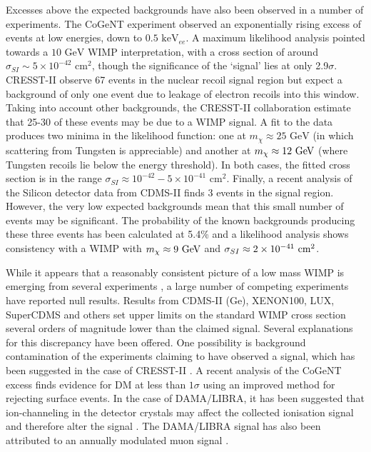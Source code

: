 Excesses above the expected backgrounds have also been observed in a number of experiments.%
The CoGeNT experiment observed an exponentially rising excess of events at low energies, down to $0.5 \textrm{ keV}_{ee}$. A maximum likelihood analysis \cite{Aalseth:2014b} pointed towards a $10 \textrm{ GeV}$ WIMP interpretation, with a cross section of around $\sigma_{SI} \sim 5 \times 10^{-42} \textrm{ cm}^2$, though the significance of the `signal' lies at only 2.9$\sigma$. CRESST-II \cite{Angloher:2012} observe 67 events in the nuclear recoil signal region but expect a background of only one event due to leakage of electron recoils into this window. Taking into account other backgrounds, the CRESST-II collaboration estimate that 25-30 of these events may be due to a WIMP signal. A fit to the data produces two minima in the likelihood function: one at $m_\chi \approx 25 \textrm{ GeV}$ (in which scattering from Tungsten is appreciable) and another at $m_\chi \approx 12 \textrm{ GeV}$ (where Tungsten recoils lie below the energy threshold). In both cases, the fitted cross section is in the range $\sigma_{SI} \approx 10^{-42} - 5 \times 10^{-41} \textrm{ cm}^2$. Finally, a recent analysis of the Silicon detector data from CDMS-II  \cite{Agnese:2013} finds 3 events in the signal region. However, the very low expected backgrounds mean that this small number of events may be significant. The probability of the known backgrounds producing these three events has been calculated at 5.4\% and a likelihood analysis shows consistency with a WIMP with $m_\chi \approx 9 \textrm{ GeV}$ and $\sigma_{SI} \approx 2 \times 10^{-41} \textrm{ cm}^2$.

While it appears that a reasonably consistent picture of a low mass WIMP is emerging from several experiments \cite{Hooper:2010}, a large number of competing experiments have reported null results. Results from CDMS-II (Ge), XENON100, LUX, SuperCDMS \cite{Agnese:2014} and others set upper limits on the standard WIMP cross section several orders of magnitude lower than the claimed signal. Several explanations for this discrepancy have been offered. One possibility is background contamination of the experiments claiming to have observed a signal, which has been suggested in the case of CRESST-II \cite{Kuzniak:2012}. A recent analysis of the CoGeNT excess \cite{Davis:2014} finds evidence for DM at less than $1\sigma$ using an improved method for rejecting surface events. In the case of DAMA/LIBRA, it has been suggested that ion-channeling in the detector crystals may affect the collected ionisation signal and therefore alter the signal \cite{Bozorgnia:2010}. The DAMA/LIBRA signal has also been attributed to an annually modulated muon signal \cite{Blum:2011,Bernabei:2012}.

